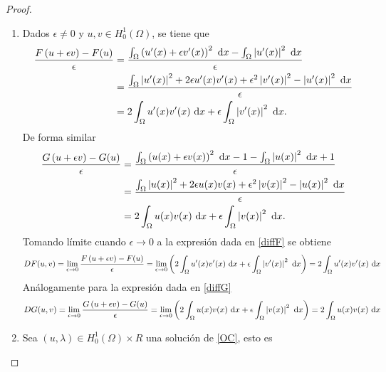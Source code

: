 \documentclass[10pt,a4paper]{report}
\newcommand{\abs}[2][y]{\if#1y\left\fi\lvert#2\if#1y\right\fi\rvert}
\theoremstyle{definition}
\renewcommand{\theproblem}{\Alph{problem}}
\numberwithin{equation}{problem}
\providecommand{\abs}[1]{\left\lvert#1\right\rvert}
\begin{document}
    \begin{proof}
    	\begin{enumerate}[label=\textbf{\theproblem.\Roman{*}.},ref=\theproblem.\Roman{*},parsep=1ex]
    		\item Dados $\epsilon\neq 0$ y $u,v\in H^{1}_{0}(\Omega)$, se tiene que
    		\begin{align}
    			\frac{F\left(u+\epsilon v\right) - F(u)}{\epsilon} &= \frac{\int_{\Omega}\left(u'(x) + \epsilon v'(x)\right)^{2}\ \text{d}x - \int_{\Omega}\abs{u'(x)}^{2}\ \text{d}x}{\epsilon}\nonumber\\ 
    			&= \frac{\int_{\Omega}\abs{u'(x)}^{2} +2\epsilon u'(x)v'(x) + \epsilon^{2}\abs{v'(x)}^{2} - \abs{u'(x)}^{2}\ \text{d}x}{\epsilon}\nonumber\\
    			&= 2\int_{\Omega}u'(x)v'(x)\ \text{d}x + \epsilon\int_{\Omega}\abs{v'(x)}^{2}\ \text{d}x\label{diffF}.
    		\end{align} 
    	    De forma similar
    	    \begin{align}
    	    	\frac{G\left(u+\epsilon v\right) - G(u)}{\epsilon} &= \frac{\int_{\Omega}\left(u(x) + \epsilon v(x)\right)^{2}\ \text{d}x - 1 - \int_{\Omega}\abs{u(x)}^{2}\ \text{d}x + 1}{\epsilon}\nonumber\\ 
    	    	&= \frac{\int_{\Omega}\abs{u(x)}^{2} +2\epsilon u(x)v(x) + \epsilon^{2}\abs{v(x)}^{2} - \abs{u(x)}^{2}\ \text{d}x}{\epsilon}\nonumber\\
    	    	&= 2\int_{\Omega}u(x)v(x)\ \text{d}x + \epsilon\int_{\Omega}\abs{v(x)}^{2}\ \text{d}x\label{diffG}.
    	    \end{align} 
    	    Tomando límite cuando $\epsilon\to 0$ a la expresión dada en \eqref{diffF} se obtiene
    	    \begin{align*}
    	    	DF(u,v) = \lim_{\epsilon\to 0}\frac{F\left(u+\epsilon v\right) - F(u)}{\epsilon} = \lim_{\epsilon\to 0}\left(2\int_{\Omega}u'(x)v'(x)\ \text{d}x + \epsilon\int_{\Omega}\abs{v'(x)}^{2}\ \text{d}x\right) = 2\int_{\Omega}u'(x)v'(x)\ \text{d}x
    	    \end{align*}
            Análogamente para la expresión dada en \eqref{diffG}
            \begin{align*}
            	DG(u,v) = \lim_{\epsilon\to 0}\frac{G\left(u+\epsilon v\right) - G(u)}{\epsilon} = \lim_{\epsilon\to 0}\left(2\int_{\Omega}u(x)v(x)\ \text{d}x + \epsilon\int_{\Omega}\abs{v(x)}^{2}\ \text{d}x\right) = 2\int_{\Omega}u(x)v(x)\ \text{d}x
            \end{align*}
            \item Sea $\left(u,\lambda\right)\in H_{0}^{1}(\Omega)\times R$ una solución de \eqref{OC}, esto es 

\end{enumerate}
\end{proof}
\end{document}
